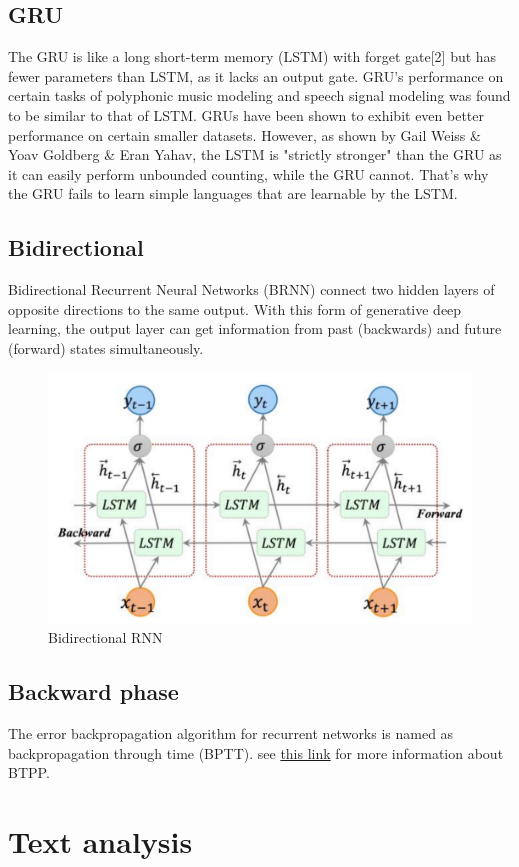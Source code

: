 \documentclass[10pt]{SelfArx} %
\begin{document}
	\subsection{GRU}
	The GRU is like a long short-term memory (LSTM) with forget gate[2] but has fewer parameters than LSTM, as it lacks an output gate. GRU's performance on certain tasks of polyphonic music modeling and speech signal modeling was found to be similar to that of LSTM. GRUs have been shown to exhibit even better performance on certain smaller datasets. However, as shown by Gail Weiss \& Yoav Goldberg \& Eran Yahav, the LSTM is "strictly stronger" than the GRU as it can easily perform unbounded counting, while the GRU cannot. That's why the GRU fails to learn simple languages that are learnable by the LSTM. 
	\subsection{Bidirectional}
	Bidirectional Recurrent Neural Networks (BRNN) connect two hidden layers of opposite directions to the same output. With this form of generative deep learning, the output layer can get information from past (backwards) and future (forward) states simultaneously.
\begin{figure}\centering 
	\includegraphics[width=.85\linewidth]{img/bidirectional}
	\caption{Bidirectional RNN}
\end{figure}
	\subsection{Backward phase}
	The error backpropagation algorithm for recurrent networks is named as backpropagation through time (BPTT). see  \href{https://machinelearningmastery.com/gentle-introduction-backpropagation-time/}{this link} for more information about BTPP.
	\section{Text analysis}
\end{document}
